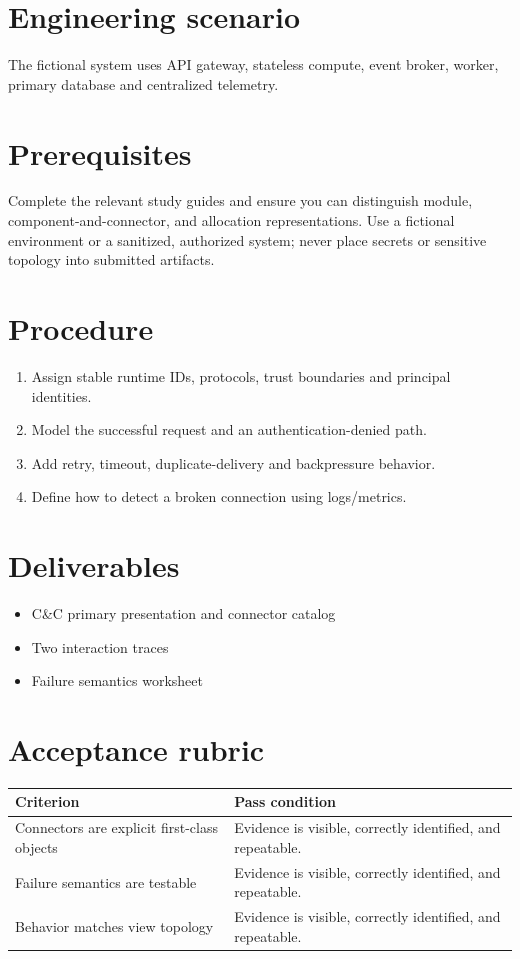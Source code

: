 \documentclass[10pt,letterpaper]{article}
\begin{document}
\DocProvenance
\section{Engineering scenario}
The fictional system uses API gateway, stateless compute, event broker, worker, primary database and centralized telemetry.

\section{Prerequisites}
Complete the relevant study guides and ensure you can distinguish module, component-and-connector, and allocation representations. Use a fictional environment or a sanitized, authorized system; never place secrets or sensitive topology into submitted artifacts.

\section{Procedure}
\begin{enumerate}
\item Assign stable runtime IDs, protocols, trust boundaries and principal identities.
\item Model the successful request and an authentication-denied path.
\item Add retry, timeout, duplicate-delivery and backpressure behavior.
\item Define how to detect a broken connection using logs/metrics.
\end{enumerate}
\section{Deliverables}
\begin{itemize}
\item C\&C primary presentation and connector catalog
\item Two interaction traces
\item Failure semantics worksheet
\end{itemize}
\section{Acceptance rubric}
\small
\begin{tabularx}{\linewidth}{@{}YY@{}}
\toprule
\textbf{Criterion} & \textbf{Pass condition} \\
\midrule
Connectors are explicit first-class objects & Evidence is visible, correctly identified, and repeatable. \\
Failure semantics are testable & Evidence is visible, correctly identified, and repeatable. \\
Behavior matches view topology & Evidence is visible, correctly identified, and repeatable. \\
\bottomrule
\end{tabularx}
\normalsize
\end{document}
